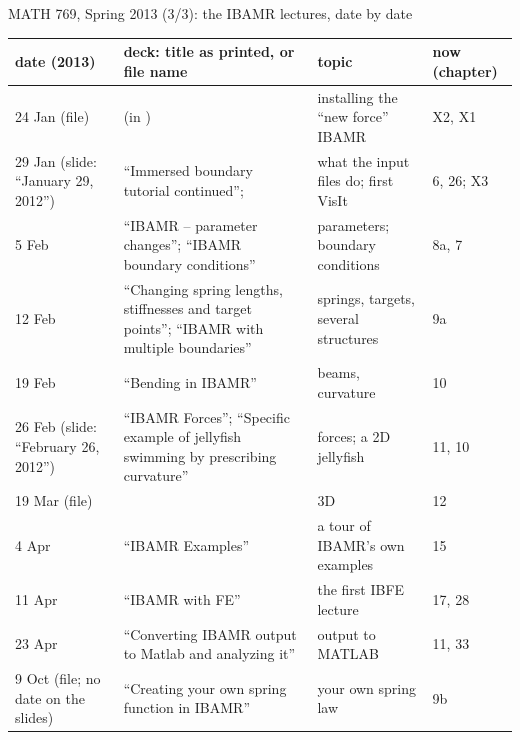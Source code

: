 \documentclass[aspectratio=169,11pt]{beamer}
\begin{document}
\begin{frame}{MATH 769, Spring 2013 (3/3): the IBAMR lectures, date by date}
\label{fr:m769b}
\tiny
\renewcommand{\arraystretch}{1.1}
\setlength{\tabcolsep}{3pt}
\begin{tabular}{@{}L{0.17\textwidth}L{0.42\textwidth}L{0.24\textwidth}L{0.11\textwidth}@{}}
\toprule
date (2013) & deck: title as printed, or file name & topic & now (chapter) \\
 Jan (file) &  (in ) & installing the ``new force'' IBAMR & X2, X1 \\
29 Jan (slide: ``January 29, 2012'') & ``Immersed boundary tutorial continued'';  & what the input files do; first VisIt & 6, 26; X3 \\
5 Feb & ``IBAMR -- parameter changes''; ``IBAMR boundary conditions'' & parameters; boundary conditions & 8a, 7 \\
12 Feb & ``Changing spring lengths, stiffnesses and target points''; ``IBAMR with multiple boundaries'' & springs, targets, several structures & 9a \\
19 Feb & ``Bending in IBAMR'' & beams, curvature & 10 \\
26 Feb (slide: ``February 26, 2012'') & ``IBAMR Forces''; ``Specific example of jellyfish swimming by prescribing curvature'' & forces; a 2D jellyfish & 11, 10 \\
19 Mar (file) &  & 3D & 12 \\
4 Apr & ``IBAMR Examples'' & a tour of IBAMR's own examples & 15 \\
11 Apr & ``IBAMR with FE'' & the first IBFE lecture & 17, 28 \\
23 Apr & ``Converting IBAMR output to Matlab and analyzing it'' & output to MATLAB & 11, 33 \\
9 Oct (file; no date on the slides) & ``Creating your own spring function in IBAMR'' & your own spring law & 9b \\
\bottomrule
\end{tabular}


\end{frame}
\end{document}
